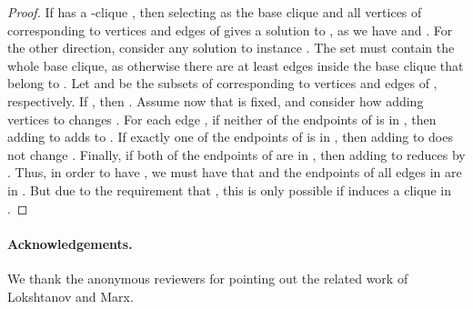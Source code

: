 \documentclass[a4paper,11pt]{article}
\theoremstyle{definition}
\theoremstyle{remark}
\begin{document}
\begin{proof}
If  has a -clique , then selecting as  the base clique and all vertices of  corresponding to vertices and edges of  gives a solution to , as we have  and 
. For the other direction, consider any solution  to instance . The set  must contain the whole base clique, as otherwise there are at least  edges inside the base clique that belong to . Let  and  be the subsets of  corresponding to vertices and edges of , respectively. If , then . Assume now that  is fixed, and consider how adding vertices to  changes  . For each edge , if neither of the endpoints of  is in , then adding  to  adds  to . If exactly one of the endpoints of  is in , then adding  to  does not change . Finally, if both of the endpoints of  are in , then adding  to  reduces  by . Thus, in order to have , we must have that  and the endpoints of all edges in  are in . But due to the requirement that , this is only possible if  induces a clique in .
\end{proof}

\paragraph{Acknowledgements.} We thank the anonymous reviewers for pointing out the related work of Lokshtanov and Marx.



\end{document}
